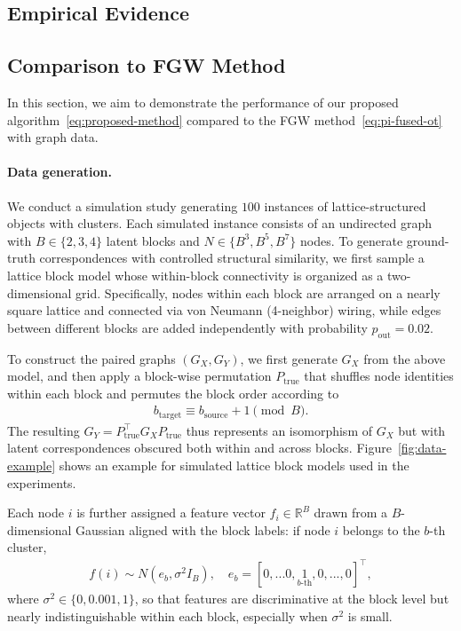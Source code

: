 \documentclass{article}
\begin{document}
\subsection{Empirical Evidence}

\subsection{Comparison to FGW Method}
In this section, we aim to demonstrate the performance of our proposed algorithm~\eqref{eq:proposed-method} compared to the FGW method~\eqref{eq:pi-fused-ot} with graph data.

\paragraph{Data generation.}
We conduct a simulation study generating $100$ instances of lattice-structured objects with clusters. Each simulated instance consists of an undirected graph with $B \in \{2,3,4\}$ latent blocks and $N \in \{B^3, B^5, B^7\}$ nodes.
To generate ground-truth correspondences with controlled structural similarity, we first sample a lattice block model whose within-block connectivity is organized as a two-dimensional grid.
Specifically, nodes within each block are arranged on a nearly square lattice and connected via von Neumann (4-neighbor) wiring, while edges between different blocks are added independently with probability $p_{\text{out}} = 0.02$.

To construct the paired graphs $(G_X, G_Y)$, we first generate $G_X$ from the above model, and then apply a block-wise permutation $P_{\text{true}}$ that shuffles node identities within each block and permutes the block order according to
\begin{align*}
	b_{\text{target}} \equiv b_{\text{source}} + 1 \pmod B .
\end{align*}
The resulting $G_Y = P_{\text{true}}^\top G_X P_{\text{true}}$ thus represents an isomorphism of $G_X$ but with latent correspondences obscured both within and across blocks. Figure~\ref{fig:data-example} shows an example for simulated lattice block models used in the experiments.

Each node $i$ is further assigned a feature vector $f_i \in \mathbb{R}^B$ drawn from a $B$-dimensional Gaussian aligned with the block labels: if node $i$ belongs to the $b$-th cluster,
\begin{align*}
	f(i) \sim N(e_b,\sigma^2 I_B) , \quad e_b = [0,...0,\underset{\text{$b$-th}}{1},0,...,0]^\top ,
\end{align*}
where $\sigma^2 \in \{0,0.001,1\}$, so that features are discriminative at the block level but nearly indistinguishable within each block, especially when $\sigma^2$ is small.
\end{document}
